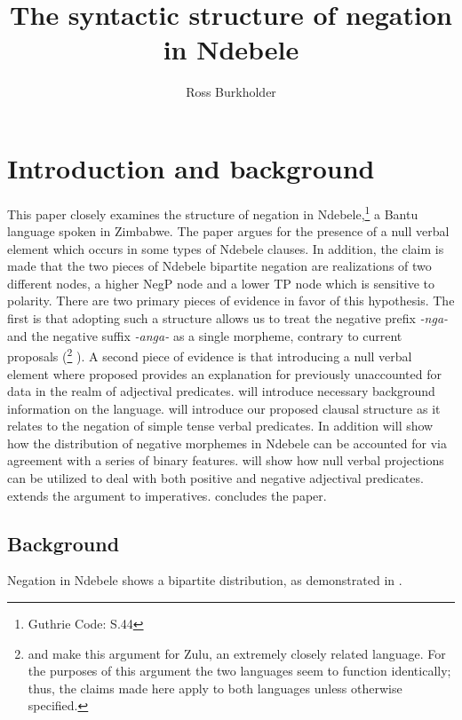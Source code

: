 \documentclass[output=paper]{langsci/langscibook}
\title{The syntactic structure of negation in Ndebele}
\author{%
 Ross Burkholder \affiliation{University of Chicago}
}
\newcommand{\nga}[0]{\textit{-nga- }}
\begin{document}
 

  

\section{Introduction and background}

This paper closely examines the structure of negation in Ndebele,\footnote{Guthrie Code: S.44} a Bantu language spoken in Zimbabwe. The paper argues for the presence of a null verbal element which occurs in some types of Ndebele clauses. In addition, the claim is made that the two pieces of Ndebele bipartite negation are realizations of two different nodes, a higher NegP node and a lower TP node which is sensitive to polarity. There are two primary pieces of evidence in favor of this hypothesis. The first is that adopting such a structure allows us to treat the negative prefix \nga and the negative suffix \textit{-anga-} as a single morpheme, contrary to current proposals (\citet{Buell2004,Buell2005}\footnote{\citet{Buell2004} and \citeyear{Buell2005} make this argument for Zulu, an extremely closely related language. For the purposes of this argument the two languages seem to function identically; thus, the claims made here apply to both languages unless otherwise specified.} \citealt{Khumalo1981,Kumalo1982,Sibanda2004}). A second piece of evidence is that introducing a null verbal element where proposed provides an explanation for previously unaccounted for data in the realm of adjectival predicates.  will introduce necessary background information on the language.   will introduce our proposed clausal structure as it relates to the negation of simple tense verbal predicates. In addition  will show how the distribution of negative morphemes in Ndebele can be accounted for via agreement with a series of binary features.  will show how null verbal projections can be utilized to deal with both positive and negative adjectival predicates.  extends the argument to imperatives.  concludes the paper. 


\subsection{Background}

Negation in Ndebele shows a bipartite distribution, as demonstrated in .
\end{document}
